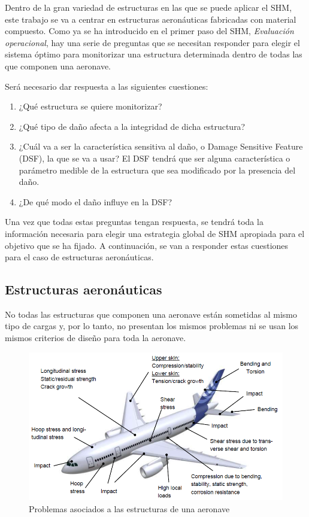Dentro de la gran variedad de estructuras en las que se puede aplicar el SHM, este trabajo se va a centrar en estructuras aeronáuticas fabricadas con material compuesto. Como ya se ha introducido en el primer paso del SHM, \textit{Evaluación operacional}, hay una serie de preguntas que se necesitan responder para elegir el sistema óptimo para monitorizar una estructura determinada dentro de todas las que componen una aeronave. 

Será necesario dar respuesta a las siguientes cuestiones:
\begin{enumerate}
    \item ¿Qué estructura se quiere monitorizar?
    \item ¿Qué tipo de daño afecta a la integridad de dicha estructura?
    \item ¿Cuál va a ser la característica sensitiva al daño, o Damage Sensitive Feature (DSF), la que se 	va a usar? El DSF tendrá que ser alguna característica o parámetro medible de la estructura que sea 		modificado por la presencia del daño.
    \item ¿De qué modo el daño influye en la DSF?
\end{enumerate}

Una vez que todas estas preguntas tengan respuesta, se tendrá toda la información necesaria para elegir una estrategia global de SHM apropiada para el objetivo que se ha fijado. A continuación, se van a responder estas cuestiones para el caso de estructuras aeronáuticas.\\

\subsection{Estructuras aeronáuticas}

No todas las estructuras que componen una aeronave están sometidas al mismo tipo de cargas y, por lo tanto, no presentan los mismos problemas ni se usan los mismos criterios de diseño para toda la aeronave.

\begin{figure}[ht]
    \centering
    \includegraphics[width=125mm]{2/Fotos/Aircraft_Sress.png}
    \caption{Problemas asociados a las estructuras de una aeronave} %
    \label{stress}
\end{figure}

